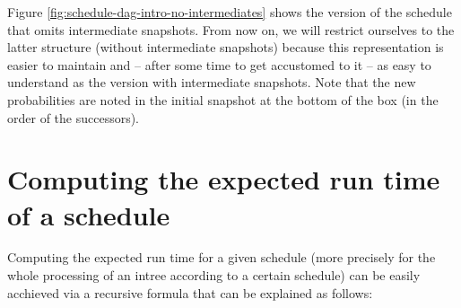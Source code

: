 Figure \ref{fig:schedule-dag-intro-no-intermediates} shows the version of the schedule that omits intermediate snapshots. From now on, we will restrict ourselves to the latter structure (without intermediate snapshots) because this representation is easier to maintain and -- after some time to get accustomed to it -- as easy to understand as the version with intermediate snapshots. Note that the new probabilities are noted in the initial snapshot at the bottom of the box (in the order of the successors).

\section{Computing the expected run time of a schedule}
\label{sec:introduction-compute-expected-time-schedule}

Computing the expected run time for a given schedule (more precisely for the whole processing of an intree according to a certain schedule) can be easily acchieved via a recursive formula that can be explained as follows:


